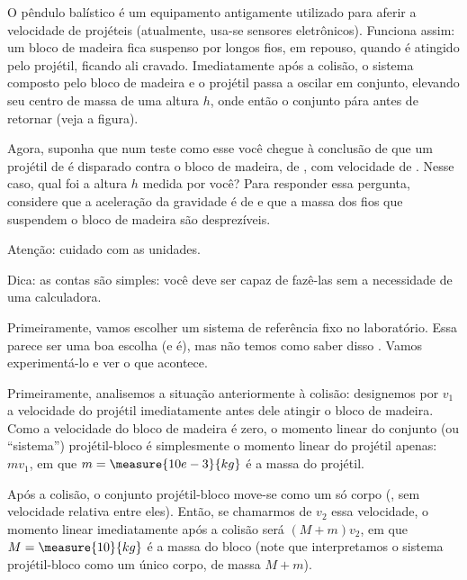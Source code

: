 \begin{question}
	O pêndulo balístico é um equipamento antigamente utilizado para aferir a velocidade de projéteis (atualmente, usa-se sensores eletrônicos).
	Funciona assim: um bloco de madeira fica suspenso por longos fios, em repouso, quando é atingido pelo projétil, ficando ali cravado.
	Imediatamente após a colisão, o sistema composto pelo bloco de madeira e o projétil passa a oscilar em conjunto, elevando seu centro de massa de uma altura $h$, onde então o conjunto pára antes de retornar (veja a figura).


	Agora, suponha que num teste como esse você chegue à conclusão de que um projétil de  é disparado contra o bloco de madeira, de , com velocidade de .
	Nesse caso, qual foi a altura $h$ medida por você?
	Para responder essa pergunta, considere que a aceleração da gravidade é de  e que a massa dos fios que suspendem o bloco de madeira são desprezíveis.

	\begin{compactdesc}
		\item[Atenção:] cuidado com as unidades.
		\item[Dica:] as contas são simples: você deve ser capaz de fazê-las sem a necessidade de uma calculadora.
	\end{compactdesc}

	\begin{answer}
	\end{answer}

	\begin{solution}
		Primeiramente, vamos escolher um sistema de referência fixo no laboratório.
		Essa parece ser uma boa escolha (e é), mas não temos como saber disso .
		Vamos experimentá-lo e ver o que acontece.

		Primeiramente, analisemos a situação anteriormente à colisão: designemos por $v_1$ a velocidade do projétil imediatamente antes dele atingir o bloco de madeira.
		Como a velocidade do bloco de madeira é zero, o momento linear do conjunto (ou ``sistema'') projétil-bloco é simplesmente o momento linear do projétil apenas: $mv_1$, em que $m = \measure{10e-3}{kg}$ é a massa do projétil.

		Após a colisão, o conjunto projétil-bloco move-se como um só corpo (\ie, sem velocidade relativa entre eles).
		Então, se chamarmos de $v_2$ essa velocidade, o momento linear imediatamente após a colisão será $(M + m)v_2$, em que $M = \measure{10}{kg}$ é a massa do bloco (note que interpretamos o sistema projétil-bloco como um único corpo, de massa $M + m$).


\end{solution}
\end{question}
